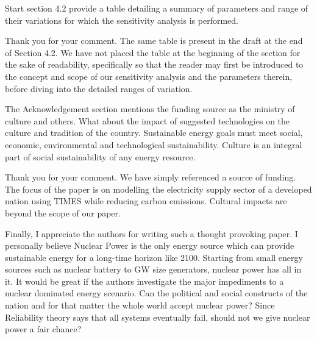 \documentclass[answers,11pt]{exam}
\begin{document}
\begin{questions}
\begin{solution}
                 
        \end{solution}     
        
                        \question   Start section 4.2 provide a table detailing a summary of parameters and range of their variations for which the sensitivity analysis is performed.
                                
        \begin{solution}
        
                 Thank you for your comment. The same table is present in the draft at the end of Section 4.2. We have not placed the table at the beginning of the section for the sake of readability, specifically so that the reader may first be introduced to the concept and scope of our sensitivity analysis and the parameters therein, before diving into the detailed ranges of variation.
                 
                 
        \end{solution} 
                        \question   The Acknowledgement section mentions the funding source as the ministry of culture and others. What about the impact of suggested technologies on the culture and tradition of the country. Sustainable energy goals must meet social, economic, environmental and technological sustainability. Culture is an integral part of social sustainability of any energy resource. 
                                
        \begin{solution}
        
                 Thank you for your comment. We have simply referenced a source of funding. The focus of the paper is on modelling the electricity supply sector of a developed nation using TIMES while reducing carbon emissions. Cultural impacts are beyond the scope of our paper.
                 
                 
        \end{solution} 
                        \question   Finally, I appreciate the authors for writing such a  thought provoking paper. I personally believe Nuclear Power is the only energy source which can provide sustainable energy for a long-time horizon like 2100. Starting from small energy sources such as nuclear battery to GW size generators, nuclear power has all in it. It would be great if the authors investigate the major impediments to a nuclear dominated energy scenario. Can the political and social constructs of the nation and for that matter the whole world accept nuclear power? Since Reliability theory says that all systems eventually fail, should not we give nuclear power a fair chance?  
                                

\end{questions}
\end{document}

